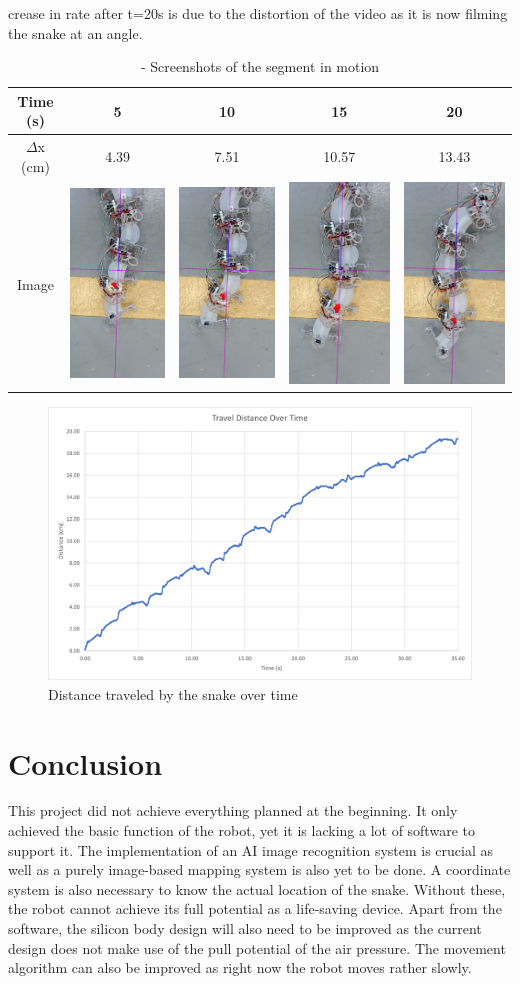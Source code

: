 \documentclass[twoside]{article}
\begin{document}
crease in rate after t=20s is due to the distortion of the video as it is now filming the snake at an angle. 

\begin{table} [H]
	\centering
	\begin{tabular}{|c|c|c|c|c|}
	\hline
	Time (s) & 5 & 10 & 15 & 20\\
	\hline
	$\Delta$x (cm) & 4.39 & 7.51 & 10.57 & 13.43\\
	\hline
	Image & \includegraphics[align=c, scale=0.25]{5} & \includegraphics[align=c, scale=0.25]{10} & \includegraphics[align=c, scale=0.25]{15} & \includegraphics[align=c, scale=0.25]{20}\\
	\hline
	\end{tabular}
	\caption{- Screenshots of the segment in motion}
\end{table}

\begin{figure} [H]
\centering
\includegraphics[width=\textwidth]{4 seg snake}
\caption{Distance traveled by the snake over time}
\end{figure}

\section{Conclusion}
This project did not achieve everything planned at the beginning. It only achieved the basic function of the robot, yet it is lacking a lot of software to support it. The implementation of an AI image recognition system is crucial as well as a purely image-based mapping system is also yet to be done. A coordinate system is also necessary to know the actual location of the snake. Without these, the robot cannot achieve its full potential as a life-saving device. Apart from the software, the silicon body design will also need to be improved as the current design does not make use of the pull potential of the air pressure. The movement algorithm can also be improved as right now the robot moves rather slowly. 





\printbibliography

\end{document}
